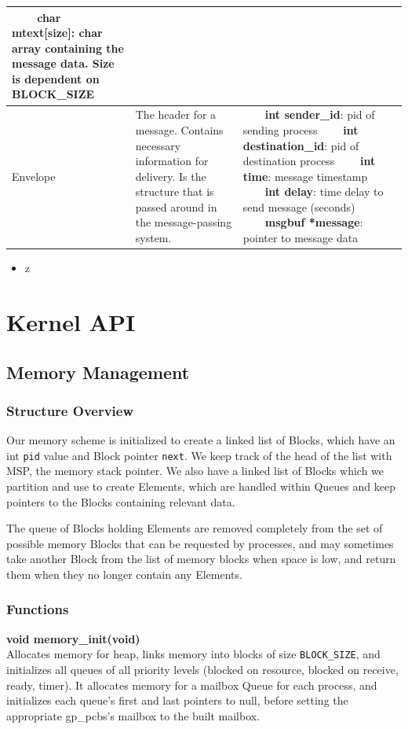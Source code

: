 \documentclass[11pt, oneside]{article}
\newcommand{\tabitem}{~~\llap{\textbullet}~~}
\begin{document}
\begin{description}
\begin{longtable}{|L{2cm}|L{5cm}|L{5cm}|}
\tabitem \textbf{char mtext[size]}: char array containing the message data. Size is dependent on BLOCK\_SIZE\\ \hline
Envelope&The header for a message. Contains necessary information for delivery. Is the structure that is passed around in the message-passing system.&
\tabitem \textbf{int sender\_id}: pid of sending process \newline
\tabitem \textbf{int destination\_id}: pid of destination process \newline
\tabitem \textbf{int time}: message timestamp \newline
\tabitem \textbf{int delay}: time delay to send message (seconds) \newline
\tabitem \textbf{msgbuf *message}: pointer to message data \newline
\\ \hline
\end{longtable}
\begin{itemize}
\item z
\end{itemize}
\end{description}

\clearpage
\section{Kernel API}
\subsection{Memory Management}
\subsubsection{Structure Overview}
Our memory scheme is initialized to create a linked list of Blocks, which have an int {\tt pid} value and Block pointer {\tt next}. We keep track of the head of the list with MSP, the memory stack pointer. We also have a linked list of Blocks which we partition and use to create Elements, which are handled within Queues and keep pointers to the Blocks containing relevant data.

The queue of Blocks holding Elements are removed completely from the set of possible memory Blocks that can be requested by processes, and may sometimes take another Block from the list of memory blocks when space is low, and return them when they no longer contain any Elements.

\subsubsection{Functions}
{\bf void memory\_init(void)}\\
Allocates memory for heap, links memory into blocks of size {\tt BLOCK\_SIZE}, and initializes all queues of all priority levels (blocked on resource, blocked on receive, ready, timer). It allocates memory for a mailbox Queue for each process, and initializes each queue's first and last pointers to null, before setting the appropriate gp\_pcbs's mailbox to the built mailbox.
\end{document}
